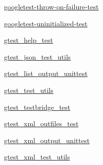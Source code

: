 \begin{DoxyCompactItemize}
 \mbox{\hyperlink{namespacegoogletest_1_1test_1_1googletest-throw-on-failure-test}{googletest-\/throw-\/on-\/failure-\/test}}
\item 
 \mbox{\hyperlink{namespacegoogletest_1_1test_1_1googletest-uninitialized-test}{googletest-\/uninitialized-\/test}}
\item 
 \mbox{\hyperlink{namespacegoogletest_1_1test_1_1gtest__help__test}{gtest\+\_\+help\+\_\+test}}
\item 
 \mbox{\hyperlink{namespacegoogletest_1_1test_1_1gtest__json__test__utils}{gtest\+\_\+json\+\_\+test\+\_\+utils}}
\item 
 \mbox{\hyperlink{namespacegoogletest_1_1test_1_1gtest__list__output__unittest}{gtest\+\_\+list\+\_\+output\+\_\+unittest}}
\item 
 \mbox{\hyperlink{namespacegoogletest_1_1test_1_1gtest__test__utils}{gtest\+\_\+test\+\_\+utils}}
\item 
 \mbox{\hyperlink{namespacegoogletest_1_1test_1_1gtest__testbridge__test}{gtest\+\_\+testbridge\+\_\+test}}
\item 
 \mbox{\hyperlink{namespacegoogletest_1_1test_1_1gtest__xml__outfiles__test}{gtest\+\_\+xml\+\_\+outfiles\+\_\+test}}
\item 
 \mbox{\hyperlink{namespacegoogletest_1_1test_1_1gtest__xml__output__unittest}{gtest\+\_\+xml\+\_\+output\+\_\+unittest}}
\item 
 \mbox{\hyperlink{namespacegoogletest_1_1test_1_1gtest__xml__test__utils}{gtest\+\_\+xml\+\_\+test\+\_\+utils}}
\end{DoxyCompactItemize}
